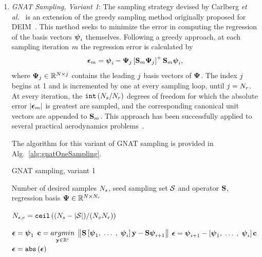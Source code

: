 \begin{enumerate}
	\item \textit{GNAT Sampling, Variant 1}: The sampling strategy devised by Carlberg \textit{et al.}~\cite{Carlberg2013} is an extension of the greedy sampling method originally proposed for DEIM~\cite{Chaturantabut2010}. This method seeks to minimize the error in computing the regression of the basis vectors $\boldsymbol{\psi}_{i}$ themselves. Following a greedy approach, at each sampling iteration $m$ the regression error is calculated by
	\begin{equation}\label{eq:gnatMetric}
		\errVec_{\greedyIdx} = \deimBasisVec_{\dummyIdx} - \deimBasis_{\dummyIdxTwo} \left[ \sampMat_{\greedyIdx} \deimBasis_{\dummyIdxTwo} \right]^+ \sampMat_{\greedyIdx}\deimBasisVec_{\dummyIdx},
	\end{equation}
    where $\deimBasis_{\dummyIdxTwo} \inRTwo{\numDOF}{\dummyIdxTwo}$ contains the leading $j$ basis vectors of $\deimBasis$. The index $j$ begins at 1 and is incremented by one at every sampling loop, until $j = N_r$. At every iteration, the $\text{\texttt{int}}\left(N_s / N_r\right)$ degrees of freedom for which the absolute error $|\boldsymbol{\epsilon}_{m}|$ is greatest are sampled, and the corresponding canonical unit vectors are appended to $\mathbf{S}_{m}$. This approach has been successfully applied to several practical aerodynamics problems~\cite{Carlberg2013,Carlberg2017}.

	The algorithm for this variant of GNAT sampling is provided in Alg.~\ref{alg:gnatOneSampling}.

	\begin{algorithm}
		\caption{GNAT sampling, variant 1}\label{alg:gnatOneSampling}
		\begin{algorithmic}
			\REQUIRE Number of desired samples $N_s$, seed sampling set $\mathcal{S}$ and operator $\mathbf{S}$, regression basis $\deimBasis \inRTwo{\numDOF}{\numResModes}$   
			
			\STATE $N_{s,e} = \mathtt{ceil} \left((N_s - \vert\mathcal{S}\vert) / (N_{v}N_r)\right)$ 
			
	
					\STATE $\boldsymbol{\epsilon} = \boldsymbol{\psi}_1$
				\ELSE
					\STATE $\mathbf{c} = \underset{\mathbf{y} \in \mathbb{R}^{i}}{argmin} \; \left\lVert\mathbf{S} \left[\boldsymbol{\psi}_1, \; \hdots \;, \; \boldsymbol{\psi}_{i} \right] \mathbf{y} - \mathbf{S} \boldsymbol{\psi}_{i+1}\right\rVert$
					\STATE $\boldsymbol{\epsilon} = \boldsymbol{\psi}_{i+1} - \left[\boldsymbol{\psi}_1, \; \hdots \;, \; \boldsymbol{\psi}_{i} \right] \mathbf{c}$
				\ENDIF
				\STATE $\boldsymbol{\epsilon} = \mathtt{abs}\left(\boldsymbol{\epsilon}\right)$
				

\end{algorithmic}
\end{algorithm}
\end{enumerate}

